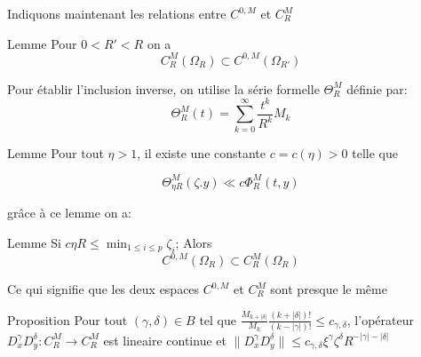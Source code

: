 \documentclass{beamer}
\newcommand{\N}{\ensuremath{\mathbb{N}}}
\begin{document}
\begin{frame}
Indiquons maintenant les relations entre  $C^{0,M}$ et $  C_R^M$

\begin{block}{Lemme}
Pour $0<R'<R$ on a $$ C_R^M(\Omega_R) \subset C^{0,M}(\Omega_{R'})$$
\end{block}


Pour établir l'inclusion inverse, on utilise la série formelle $ \Theta^M_R$ définie par:
 \begin{equation*}
 \Theta^M_R(t)=\sum_{k=0}^\infty \frac{t^k}{R^k}M_k
 \end{equation*}

\end{frame}

\begin{frame}

\begin{block}{Lemme}
Pour tout $ \eta >1 $, il existe  une constante $c=c(\eta) >0$ telle que 

$$\Theta^M_{\eta R} (\zeta.y) \ll c  \Phi^M_R(t,y)  $$
\end{block}
grâce à ce lemme on a:


\begin{block}{Lemme}
 Si  $c\eta R  \leq \min_{1\leq i \leq p} \zeta_i$; Alors $$ C^{0,M}(\Omega_R) \subset  C_R^M (\Omega_R)$$
\end{block}
Ce qui signifie que les deux espaces $C^{0,M}$ et $  C_R^M$ sont presque le même
\end{frame}


\begin{frame}
\begin{block}{Proposition}
Pour tout $(\gamma ,\delta) \in B$  tel que $ \frac{M_{k+|\delta|}}{M_k}  \frac{(k+|\delta|)!}{ (k-|\gamma|)!}  \leq c_{\gamma, \delta}$, l'opérateur $ D_x^\gamma D_y^\delta : C^M_R\rightarrow C^M_R $  est lineaire continue et  
$\| D_x^\gamma D_y^\delta\|\leq c_{\gamma ,\delta} \xi^\gamma\zeta^\delta R^{-|\gamma|-|\delta|}$
\end{block}

\end{frame}
\end{document}
